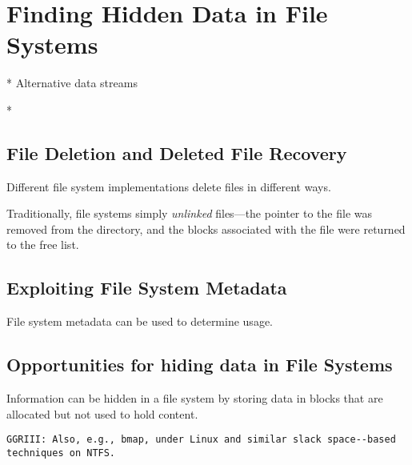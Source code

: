 \chapter{Finding Hidden Data in File Systems}\label{ch-fshidden}

* Alternative data streams

* 

\section{File Deletion and Deleted File Recovery}\label{deleted_file_recovery}
Different file system implementations delete files in different ways.

Traditionally, file systems simply \emph{unlinked} files---the pointer
to the file was removed from the directory, and the blocks associated
with the file were returned to the free list.


\section{Exploiting File System Metadata}
File system metadata can be used to determine usage. 
\cite{dfrws2011:JonathanGrier}

\section{Opportunities for hiding data in File Systems}

Information can be hidden in a file system by storing data in blocks
that are allocated but not used to hold content\cite{dfrws2005:KnutEcksteinAndMarkoJahnke}. 

\begin{Verbatim}
GGRIII: Also, e.g., bmap, under Linux and similar slack space--based techniques on NTFS.
\end{Verbatim}
